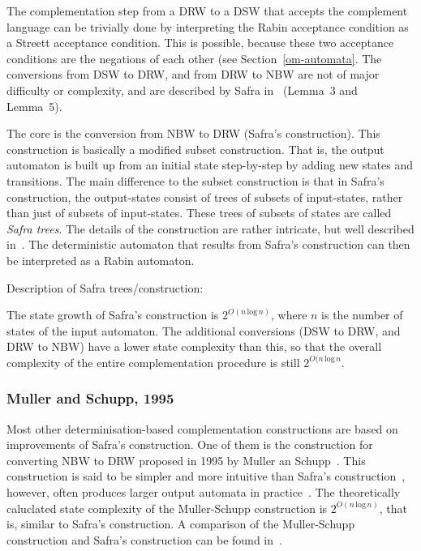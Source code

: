 The complementation step from a DRW to a DSW that accepts the complement language can be trivially done by interpreting the Rabin acceptance condition as a Streett acceptance condition. This is possible, because these two acceptance conditions are the negations of each other (see Section~\ref{om-automata}. The conversions from DSW to DRW, and from DRW to NBW are not of major difficulty or complexity, and are described by Safra in~\cite{1988_safra_2} (Lemma~3 and Lemma~5).

The core is the conversion from NBW to DRW (Safra's construction). This construction is basically a modified subset construction. That is, the output automaton is built up from an initial state step-by-step by adding new states and transitions. The main difference to the subset construction is that in Safra's construction, the output-states consist of trees of subsets of input-states, rather than just of subsets of input-states. These trees of subsets of states are called \textit{Safra trees}. The details of the construction are rather intricate, but well described in~\cite{1988_safra_2}. The deterministic automaton that results from Safra's construction can then be interpreted as a Rabin automaton.

Description of Safra trees/construction: \cite{2006_althoff}~\cite{2002_roggenbach}

The state growth of Safra's construction is $2^{O\left(n\, \text{log}\, n\right)}$, where $n$ is the number of states of the input automaton. The additional conversions (DSW to DRW, and DRW to NBW) have a lower state complexity than this, so that the overall complexity of the entire complementation procedure is still $2^{O(n\, \text{log}\, n}$.

\subsubsection{Muller and Schupp, 1995}
\label{2_ms95}
Most other determinisation-based complementation constructions are based on improvements of Safra's construction. One of them is the construction for converting NBW to DRW proposed in 1995 by Muller an Schupp~\cite{Muller199569}. This construction is said to be simpler and more intuitive than Safra's construction~\cite{2002_roggenbach}, however, often produces larger output automata in practice~\cite{2006_althoff}. The theoretically caluclated state complexity of the Muller-Schupp construction is $2^{O\left(n\, \text{log}\, n\right)}$, that is, similar to Safra's construction. A comparison of the Muller-Schupp construction and Safra's construction can be found in~\cite{2006_althoff}.

